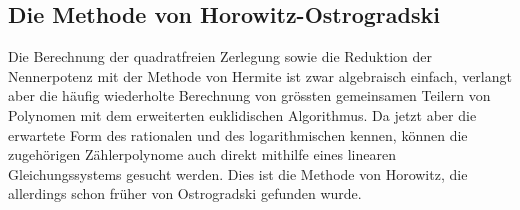 %
%
\subsection{Die Methode von Horowitz-Ostrogradski}
Die Berechnung der quadratfreien Zerlegung sowie die Reduktion
der Nennerpotenz mit der Methode von Hermite ist zwar algebraisch
einfach, verlangt aber die häufig wiederholte Berechnung von 
grössten gemeinsamen Teilern von Polynomen mit dem erweiterten
euklidischen Algorithmus.
Da jetzt aber die erwartete Form des rationalen und des logarithmischen
kennen, können die zugehörigen Zählerpolynome auch direkt mithilfe
eines linearen Gleichungssystems gesucht werden.
Dies ist die Methode von Horowitz, die allerdings schon früher von
Ostrogradski gefunden wurde.


